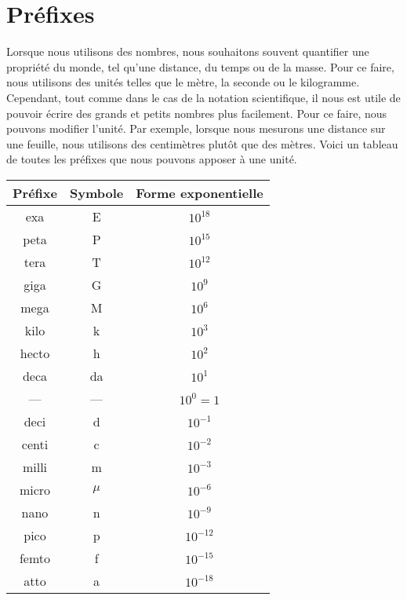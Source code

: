 
\section{Préfixes}

Lorsque nous utilisons des nombres, nous souhaitons souvent quantifier une propriété du monde, tel qu'une distance, du temps ou de la masse. Pour ce faire, nous utilisons des unités telles que le mètre, la seconde ou le kilogramme. Cependant, tout comme dans le cas de la notation scientifique, il nous est utile de pouvoir écrire des grands et petits nombres plus facilement. Pour ce faire, nous pouvons modifier l'unité. Par exemple, lorsque nous mesurons une distance sur une feuille, nous utilisons des centimètres plutôt que des mètres. Voici un tableau de toutes les préfixes que nous pouvons apposer à une unité.

\begin{table}[H]
	\centering
	\begin{tabular}{|c|c|c|}
	\hline
	\textbf{Préfixe} & \textbf{Symbole} & \textbf{Forme exponentielle} \\ \hline
	exa & E & $10^{18}$ \\ \hline
	peta & P & $10^{15}$ \\ \hline
	tera & T & $10^{12}$ \\ \hline
	giga & G & $10^{9}$ \\ \hline
	mega & M & $10^{6}$ \\ \hline
	kilo & k & $10^{3}$ \\ \hline
	hecto & h & $10^{2}$ \\ \hline
	deca & da & $10^{1}$ \\ \hline
	--- & --- & $10^{0} = 1$ \\ \hline
	deci & d & $10^{-1}$ \\ \hline
	centi & c & $10^{-2}$ \\ \hline
	milli & m & $10^{-3}$ \\ \hline
	micro & $\mu$ & $10^{-6}$ \\ \hline
	nano & n & $10^{-9}$ \\ \hline
	pico & p & $10^{-12}$ \\ \hline
	femto & f & $10^{-15}$ \\ \hline
	atto & a & $10^{-18}$ \\ \hline
	\end{tabular}
\end{table}

